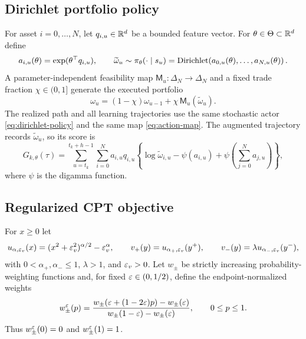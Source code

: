 \subsection{Dirichlet portfolio policy}

For asset $i=0,\ldots,N$, let $q_{i,u}\in\mathbb R^d$ be a bounded feature vector.  For $\theta\in\Theta\subset\mathbb R^d$ define
\begin{equation}\label{eq:dirichlet-policy}
 a_{i,u}(\theta)=\exp(\theta^\top q_{i,u}),
 \qquad
 \widetilde\omega_u\sim
 \pi_\theta(\cdot\mid s_u)
 =\operatorname{Dirichlet}\!\left(a_{0,u}(\theta),\ldots,a_{N,u}(\theta)\right).
\end{equation}
A parameter-independent feasibility map $\mathsf M_u:\Delta_N\to\Delta_N$ and a fixed trade fraction $\chi\in(0,1]$ generate the executed portfolio
\begin{equation}\label{eq:action-map}
 \omega_u=(1-\chi)\omega_{u-1}+\chi\,\mathsf M_u(\widetilde\omega_u).
\end{equation}
The realized path and all learning trajectories use the same stochastic actor \eqref{eq:dirichlet-policy} and the same map \eqref{eq:action-map}.  The augmented trajectory records $\widetilde\omega_u$, so its score is
\begin{equation}\label{eq:trajectory-score}
 G_{k,\theta}(\tau)
 =\sum_{u=t_k}^{t_k+h-1}\sum_{i=0}^{N}
 a_{i,u}q_{i,u}
 \left\{\log\widetilde\omega_{i,u}
 -\psi(a_{i,u})+\psi\!\left(\sum_{j=0}^{N}a_{j,u}\right)\right\},
\end{equation}
where $\psi$ is the digamma function.

\subsection{Regularized CPT objective}

For $x\ge0$ let
\begin{equation}\label{eq:value-functions}
 u_{\alpha,\varepsilon_v}(x)=(x^2+\varepsilon_v^2)^{\alpha/2}-\varepsilon_v^\alpha,
 \qquad
 v_+(y)=u_{\alpha_+,\varepsilon_v}(y^+),
 \qquad
 v_-(y)=\lambda u_{\alpha_-,\varepsilon_v}(y^-),
\end{equation}
with $0<\alpha_+,\alpha_-\le1$, $\lambda>1$, and $\varepsilon_v>0$.  Let $w_\pm$ be strictly increasing probability-weighting functions and, for fixed $\varepsilon\in(0,1/2)$, define the endpoint-normalized weights
\begin{equation}\label{eq:normalized-weight}
 w_\pm^\varepsilon(p)
 =\frac{w_\pm(\varepsilon+(1-2\varepsilon)p)-w_\pm(\varepsilon)}
 {w_\pm(1-\varepsilon)-w_\pm(\varepsilon)},
 \qquad 0\le p\le1.
\end{equation}
Thus $w_\pm^\varepsilon(0)=0$ and $w_\pm^\varepsilon(1)=1$.


